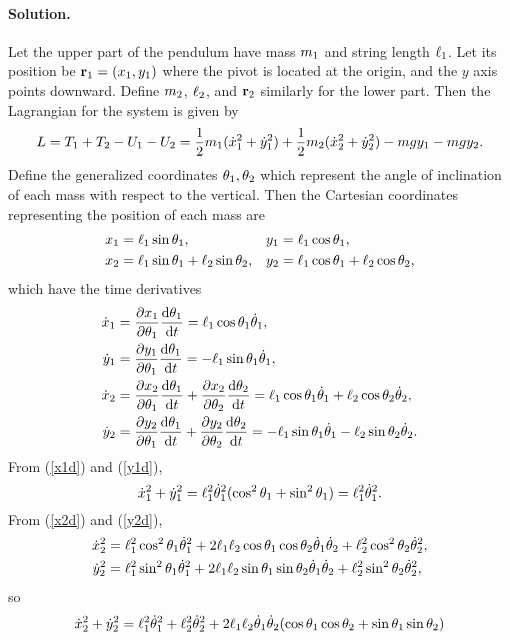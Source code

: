 \documentclass[11pt]{article}
\newcommand{\refeq}[1]{(\ref{#1})}
\newenvironment{solution}
{
    \paragraph{Solution.}
    \ignorespaces
}
{
    \bigskip
}
\begin{document}
\begin{solution}
	Let the upper part of the pendulum have mass $m_1$ and string length $\ell_1$.  Let its position be $\mathbf{r}_1 = (x_1, y_1)$ where the pivot is located at the origin, and the $y$ axis points downward.  Define $m_2$, $\ell_2$, and $\mathbf{r}_2$ similarly for the lower part.  Then the Lagrangian for the system is given by
	\begin{equation} \label{lagrdp}
		L = T_1 + T_2 - U_1 - U_2 = \frac{1}{2} m_1 (\dot{x}_1^2 + \dot{y}_1^2) + \frac{1}{2} m_2 (\dot{x}_2^2 + \dot{y}_2^2) - m g y_1 - m g y_2.
	\end{equation}
	Define the generalized coordinates $\theta_1, \theta_2$ which represent the angle of inclination of each mass with respect to the vertical.  Then the Cartesian coordinates representing the position of each mass are
	\begin{align}
		x_1 &= \ell_1 \sin{\theta_1}, &
		y_1 &= \ell_1 \cos{\theta_1}, \\
		x_2 &= \ell_1 \sin{\theta_1} + \ell_2 \sin{\theta_2}, &
		y_2 &= \ell_1 \cos{\theta_1} + \ell_2 \cos{\theta_2},
	\end{align}
	which have the time derivatives
	\begin{align}
		\dot{x}_1 &= \pdv{x_1}{\theta_1} \dv{\theta_1}{t} = \ell_1 \cos{\theta_1} \dot{\theta}_1, \label{x1d} \\
		\dot{y}_1 &= \pdv{y_1}{\theta_1} \dv{\theta_1}{t} = -\ell_1 \sin{\theta_1} \dot{\theta}_1, \label{y1d} \\
		\dot{x}_2 &= \pdv{x_2}{\theta_1} \dv{\theta_1}{t} + \pdv{x_2}{\theta_2} \dv{\theta_2}{t} = \ell_1 \cos{\theta_1} \dot{\theta}_1 + \ell_2 \cos{\theta_2} \dot{\theta}_2, \label{x2d} \\
		\dot{y}_2 &= \pdv{y_2}{\theta_1} \dv{\theta_1}{t} + \pdv{y_2}{\theta_2} \dv{\theta_2}{t} = -\ell_1 \sin{\theta_1} \dot{\theta}_1 - \ell_2 \sin{\theta_2} \dot{\theta}_2. \label{y2d}
	\end{align}
	From \refeq{x1d} and \refeq{y1d},
	\begin{equation}
		\dot{x}_1^2 + \dot{y}_1^2 = \ell_1^2 \dot{\theta}_1^2 (\cos^2{\theta_1} + \sin^2{\theta_1}) = \ell_1^2 \dot{\theta}_1^2.
	\end{equation}
	From \refeq{x2d} and \refeq{y2d},
	\begin{align}
		\dot{x}_2^2 &= \ell_1^2 \cos^2{\theta_1} \dot{\theta}_1^2 + 2 \ell_1 \ell_2 \cos{\theta_1} \cos{\theta_2} \dot{\theta}_1 \dot{\theta}_2 + \ell_2^2 \cos^2{\theta_2} \dot{\theta}_2^2, \\
		\dot{y}_2^2 &= \ell_1^2 \sin^2{\theta_1} \dot{\theta}_1^2 + 2 \ell_1 \ell_2 \sin{\theta_1} \sin{\theta_2} \dot{\theta}_1 \dot{\theta}_2 + \ell_2^2 \sin^2{\theta_2} \dot{\theta}_2^2,
	\end{align}
	so
	\begin{align}
		\xdw^2 + \ydw^2 &= \elq^2 \thdq^2 + \elw^2 \thdw^2 + 2 \elq \elw \thdq \thdw (\cos{\thq} \cos{\thw} + \sin{\thq} \sin{\thw}) \\

\end{align}
\end{solution}
\end{document}
